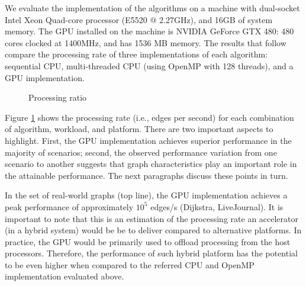 We evaluate the implementation of the algorithms on a machine with dual-socket Intel Xeon Quad-core processor (E5520 @ 2.27GHz), and 16GB of system memory. The GPU installed on the machine is NVIDIA GeForce GTX 480: 480 cores clocked at 1400MHz, and has 1536 MB memory. The results that follow compare the processing rate of three implementations of each algorithm: sequential CPU, multi-threaded CPU (using OpenMP with 128 threads), and a GPU implementation.

\begin{figure}[ht]
\begin{center}
\mbox{}
\caption{Processing ratio}
\label{fig:rate}
\end{center}
\end{figure}

Figure \ref{fig:rate} shows the processing rate (i.e., edges per second) for each combination of algorithm, workload, and platform. There are two important aspects to highlight. First, the GPU implementation achieves superior performance in the majority of scenarios; second, the observed performance variation from one scenario to another suggests that graph characteristics play an important role in the attainable performance. The next paragraphs discuss these points in turn.

In the set of real-world graphs (top line), the GPU implementation achieves a peak performance of approximately $10^5$ edges/s (Dijkstra, LiveJournal). It is important to note that this is an estimation of the processing rate an accelerator (in a hybrid system) would be be to deliver compared to alternative platforms. In practice, the GPU would be primarily used to offload processing from the host processors. Therefore, the performance of such hybrid platform has the potential to be even higher when compared to the referred CPU and OpenMP implementation evaluated above.

